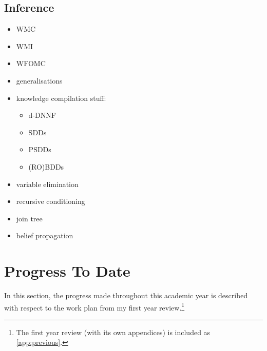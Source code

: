 \documentclass{article}
\begin{document}
\subsection{Inference}

\begin{itemize}
\item WMC \cite{DBLP:journals/ai/ChaviraD08}
\item WMI \cite{DBLP:conf/ijcai/BellePB15}
\item WFOMC \cite{DBLP:conf/ijcai/BroeckTMDR11,DBLP:journals/cacm/GogateD16}
\item generalisations
  \cite{DBLP:journals/ijar/BelleR20,DBLP:journals/jair/BacchusDP09,DBLP:journals/japll/KimmigBR17}
\item knowledge compilation stuff:
  \begin{itemize}
  \item d-DNNF \cite{DBLP:journals/jancl/Darwiche01}
  \item SDDs \cite{DBLP:conf/ijcai/Darwiche11}
  \item PSDDs \cite{DBLP:conf/kr/KisaBCD14}
  \item (RO)BDDs \cite{DBLP:journals/tc/Bryant86}
  \end{itemize}
\item variable elimination \cite{DBLP:journals/ai/Dechter99}
\item recursive conditioning \cite{DBLP:journals/ai/Darwiche01}
\item join tree \cite{lauritzen1988local}
\item belief propagation \cite{DBLP:conf/aaai/Pearl82}
\end{itemize}

\section{Progress To Date} \label{sec:progress}

In this section, the progress made throughout this academic year is described
with respect to the work plan from my first year review.\footnote{The first year
review (with its own appendices) is included as \cref{app:previous}.}
\end{document}
